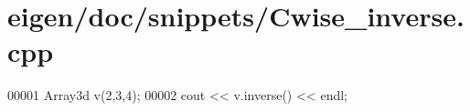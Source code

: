 \hypertarget{eigen_2doc_2snippets_2_cwise__inverse_8cpp_source}{}\section{eigen/doc/snippets/\+Cwise\+\_\+inverse.cpp}
\label{eigen_2doc_2snippets_2_cwise__inverse_8cpp_source}

\begin{DoxyCode}
00001 Array3d v(2,3,4);
00002 cout << v.inverse() << endl;
\end{DoxyCode}

